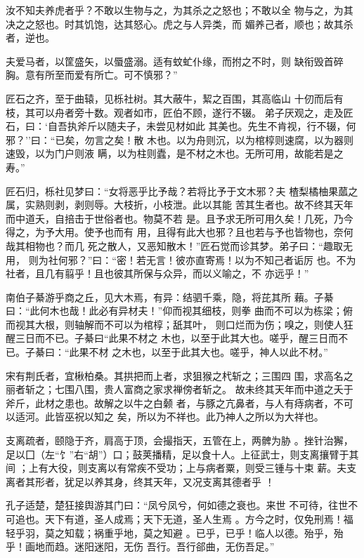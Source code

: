 \documentclass[]{article}
\begin{document}
汝不知夫养虎者乎？不敢以生物与之，为其杀之之怒也；不敢以全
物与之，为其决之之怒也。时其饥饱，达其怒心。虎之与人异类，而
媚养己者，顺也；故其杀者，逆也。

夫爱马者，以筐盛矢，以蜃盛溺。适有蚊虻仆缘，而拊之不时，则
缺衔毁首碎胸。意有所至而爱有所亡。可不慎邪？''

匠石之齐，至于曲辕，见栎社树。其大蔽牛，絜之百围，其高临山
十仞而后有枝，其可以舟者旁十数。观者如市，匠伯不顾，遂行不辍。
弟子厌观之，走及匠石，曰：`自吾执斧斤以随夫子，未尝见材如此
其美也。先生不肯视，行不辍，何邪？''曰：``已矣，勿言之矣！散
木也。以为舟则沉，以为棺椁则速腐，以为器则速毁，以为门户则液
瞒，以为柱则蠹，是不材之木也。无所可用，故能若是之寿。''

匠石归，栎社见梦曰：``女将恶乎比予哉？若将比予于文木邪？夫
楂梨橘柚果蓏之属，实熟则剥，剥则辱。大枝折，小枝泄。此以其能
苦其生者也。故不终其天年而中道夭，自掊击于世俗者也。物莫不若
是。且予求无所可用久矣！几死，乃今得之，为予大用。使予也而有
用，且得有此大也邪？且也若与予也皆物也，奈何哉其相物也？而几
死之散人，又恶知散木！''匠石觉而诊其梦。弟子曰：``趣取无用，
则为社何邪？''曰：``密！若无言！彼亦直寄焉！以为不知己者诟厉
也。不为社者，且几有翦乎！且也彼其所保与众异，而以义喻之，不 亦远乎！''

南伯子綦游乎商之丘，见大木焉，有异：结驷千乘，隐，将芘其所
藾。子綦曰：``此何木也哉！此必有异材夫！''仰而视其细枝，则拳
曲而不可以为栋梁；俯而视其大根，则轴解而不可以为棺椁；舐其叶，
则口烂而为伤；嗅之，则使人狂醒三日而不已。子綦曰``此果不材之
木也，以至于此其大也。嗟乎，醒三日而不已。子綦曰：``此果不材
之木也，以至于此其大也。嗟乎，神人以此不材。''

宋有荆氏者，宜楸柏桑。其拱把而上者，求狙猴之杙斩之；三围四
围，求高名之丽者斩之；七围八围，贵人富商之家求禅傍者斩之。
故未终其天年而中道之夭于斧斤，此材之患也。故解之以牛之白颡
者，与豚之亢鼻者，与人有痔病者，不可以适河。此皆巫祝以知之
矣，所以为不祥也。此乃神人之所以为大祥也。

支离疏者，颐隐于齐，肩高于顶，会撮指天，五管在上，两髀为胁
。挫针治獬，足以囗（左``饣''右``胡''）口；鼓荚播精，足以食十人。上征武士，则支离攘臂于其间
；上有大役，则支离以有常疾不受功；上与病者粟，则受三锺与十束
薪。夫支离者其形者，犹足以养其身，终其天年，又况支离其德者乎 ！

孔子适楚，楚狂接舆游其门曰：``凤兮凤兮，何如德之衰也。来世
不可待，往世不可追也。天下有道，圣人成焉；天下无道，圣人生焉
。方今之时，仅免刑焉！福轻乎羽，莫之知载；祸重乎地，莫之知避
。已乎，已乎！临人以德。殆乎，殆乎！画地而趋。迷阳迷阳，无伤
吾行。吾行郤曲，无伤吾足。''
\end{document}
